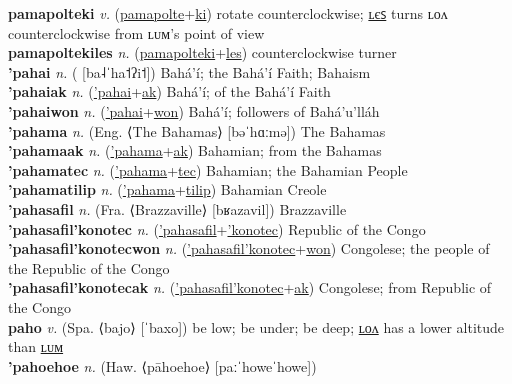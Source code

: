 \textbf{pamapolteki} \textit{v.} (\hyperref[pamapolte]{pamapolte}+\hyperref[ki]{ki})
rotate counterclockwise; \hyperref[pamapoltekiles]{ʟєꜱ} turns ʟᴏᴧ counterclockwise from ʟᴜᴍ’s point of view \label{pamapolteki} \\
\textbf{pamapoltekiles} \textit{n.} (\hyperref[pamapolteki]{pamapolteki}+\hyperref[les]{les})
counterclockwise turner \label{pamapoltekiles} \\
\textbf{'pahai} \textit{n.} ( [ba˨ˈha˦ʔi˦])
Bahá’í; the Bahá’í Faith; Bahaism \label{'pahai} \\
\textbf{'pahaiak} \textit{n.} (\hyperref['pahai]{'pahai}+\hyperref[ak]{ak})
Bahá’í; of the Bahá’í Faith \label{'pahaiak} \\
\textbf{'pahaiwon} \textit{n.} (\hyperref['pahai]{'pahai}+\hyperref[won]{won})
Bahá’í; followers of Bahá’u’lláh \label{'pahaiwon} \\
\textbf{'pahama} \textit{n.} (Eng. ⟨The Bahamas⟩ [bəˈhɑːmə])
The Bahamas \label{'pahama} \\
\textbf{'pahamaak} \textit{n.} (\hyperref['pahama]{'pahama}+\hyperref[ak]{ak})
Bahamian; from the Bahamas \label{'pahamaak} \\
\textbf{'pahamatec} \textit{n.} (\hyperref['pahama]{'pahama}+\hyperref[tec]{tec})
Bahamian; the Bahamian People \label{'pahamatec} \\
\textbf{'pahamatilip} \textit{n.} (\hyperref['pahama]{'pahama}+\hyperref[tilip]{tilip})
Bahamian Creole \label{'pahamatilip} \\
\textbf{'pahasafil} \textit{n.} (Fra. ⟨Brazzaville⟩ [bʁazavil])
Brazzaville \label{'pahasafil} \\
\textbf{'pahasafil'konotec} \textit{n.} (\hyperref['pahasafil]{'pahasafil}+\hyperref['konotec]{'konotec})
Republic of the Congo \label{'pahasafil'konotec} \\
\textbf{'pahasafil'konotecwon} \textit{n.} (\hyperref['pahasafil'konotec]{'pahasafil'konotec}+\hyperref[won]{won})
Congolese; the people of the Republic of the Congo \label{'pahasafil'konotecwon} \\
\textbf{'pahasafil'konotecak} \textit{n.} (\hyperref['pahasafil'konotec]{'pahasafil'konotec}+\hyperref[ak]{ak})
Congolese; from Republic of the Congo \label{'pahasafil'konotecak} \\
\textbf{paho} \textit{v.} (Spa. ⟨bajo⟩ [ˈbaxo])
be low; be under; be deep; \hyperref[paholon]{ʟᴏᴧ} has a lower altitude than \hyperref[paholum]{ʟᴜᴍ} \label{paho} \\
\textbf{'pahoehoe} \textit{n.} (Haw. ⟨pāhoehoe⟩ [paːˈhoweˈhowe])
